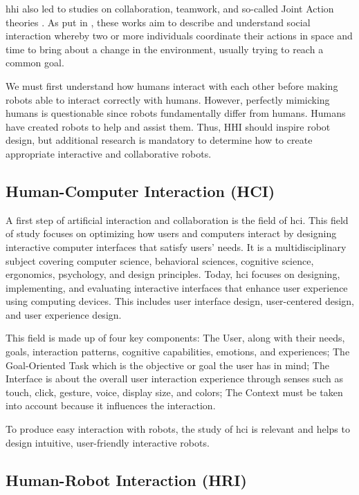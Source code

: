 \acrshort{hhi} also led to studies on collaboration, teamwork, and so-called Joint Action theories \cite{cohen_team_1970,levesque_acting_1990,cohen_teamwork_1991}. As put in \cite{sebanz_2006joint}, these works aim to describe and understand social interaction whereby two or more individuals coordinate their actions in space and time to bring about a change in the environment, usually trying to reach a common goal.

We must first understand how humans interact with each other before making robots able to interact correctly with humans. However, perfectly mimicking humans is questionable since robots fundamentally differ from humans. Humans have created robots to help and assist them. Thus, HHI should inspire robot design, but additional research is mandatory to determine how to create appropriate interactive and collaborative robots.

\subsection{Human-Computer Interaction (HCI)}

A first step of artificial interaction and collaboration is the field of \acrfull{hci}. This field of study focuses on optimizing how users and computers interact by designing interactive computer interfaces that satisfy users' needs. It is a multidisciplinary subject covering computer science, behavioral sciences, cognitive science, ergonomics, psychology, and design principles.
Today, \acrshort{hci} focuses on designing, implementing, and evaluating interactive interfaces that enhance user experience using computing devices. This includes user interface design, user-centered design, and user experience design. 

This field is made up of four key components: 
The User, along with their needs, goals, interaction patterns, cognitive capabilities, emotions, and experiences; 
The Goal-Oriented Task which is the objective or goal the user has in mind; 
The Interface is about the overall user interaction experience through senses such as touch, click, gesture, voice, display size, and colors;
The Context must be taken into account because it influences the interaction. 

To produce easy interaction with robots, the study of \acrshort{hci} is relevant and helps to design intuitive, user-friendly interactive robots.

\subsection{Human-Robot Interaction (HRI)}

